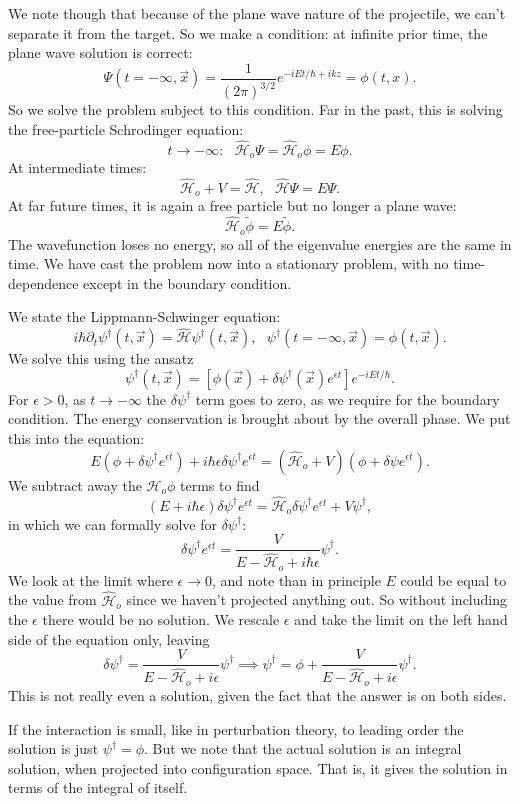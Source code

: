 \documentclass[fontsize=12pt]{scrartcl}
\newcommand{\ptl}{\partial}
\newcommand{\Ham}{\hat{\mathcal{H}}}
\begin{document}
We note though that because of the plane wave nature of the projectile, we can't separate it from the target. So we make a condition: at infinite prior time, the plane wave solution is correct: $$\Psi(t=-\infty,\vec{x}) = \frac{1}{(2\pi)^{3/2}}e^{-iEt/\hbar + ikz}=\phi(t,x).$$ So we solve the problem subject to this condition. Far in the past, this is solving the free-particle Schrodinger equation: $$t\to -\infty: \ \ \ \Ham_o\Psi = \Ham_o\phi = E\phi.$$ At intermediate times: $$\Ham_o+V= \Ham, \ \ \ \Ham\Psi = E\Psi.$$ At far future times, it is again a free particle but no longer a plane wave: $$\Ham_o\tilde{\phi} = E\tilde{\phi}.$$ The wavefunction loses no energy, so all of the eigenvalue energies are the same in time. We have cast the problem now into a stationary problem, with no time-dependence except in the boundary condition.

We state the Lippmann-Schwinger equation: $$i\hbar\ptl_t \psi^\dagger(t,\vec{x}) = \Ham \psi^\dagger(t,\vec{x}), \ \ \ \psi^\dagger(t=-\infty,\vec{x})=\phi(t,\vec{x}).$$ We solve this using the ansatz $$\psi^\dagger(t,\vec{x})= \left[\phi(\vec{x}) + \delta\psi^\dagger(\vec{x})e^{\epsilon t}\right] e^{-iEt/\hbar}.$$ For $\epsilon>0$, as $t\to -\infty$ the $\delta\psi^\dagger$ term goes to zero, as we require for the boundary condition. The energy conservation is brought about by the overall phase. We put this into the equation: $$E(\phi + \delta\psi^\dagger e^{\epsilon t})+i\hbar\epsilon\delta\psi^\dagger e^{\epsilon t} = (\Ham_o+V)(\phi+\delta\psi e^{\epsilon t}).$$ We subtract away the $\Ham_o\phi$ terms to find $$(E+i\hbar\epsilon)\delta\psi^\dagger e^{\epsilon t} = \Ham_o\delta\psi^\dagger e^{\epsilon t}+V\psi^\dagger,$$ in which we can formally solve for $\delta\psi^\dagger$: $$\delta\psi^\dagger e^{\epsilon t} = \frac{V}{E-\Ham_o + i\hbar\epsilon} \psi^\dagger.$$ We look at the limit where $\epsilon\to 0$, and note than in principle $E$ could be equal to the value from $\Ham_o$ since we haven't projected anything out. So without including the $\epsilon$ there would be no solution. We rescale $\epsilon$ and take the limit on the left hand side of the equation only, leaving $$\delta\psi^\dagger = \frac{V}{E-\Ham_o+i\epsilon}\psi^\dagger\implies \psi^\dagger = \phi + \frac{V}{E-\Ham_o+i\epsilon}\psi^\dagger.$$ This is not really even a solution, given the fact that the answer is on both sides. 

If the interaction is small, like in perturbation theory, to leading order the solution is just $\psi^\dagger=\phi$. But we note that the actual solution is an integral solution, when projected into configuration space. That is, it gives the solution in terms of the integral of itself.
\end{document}
